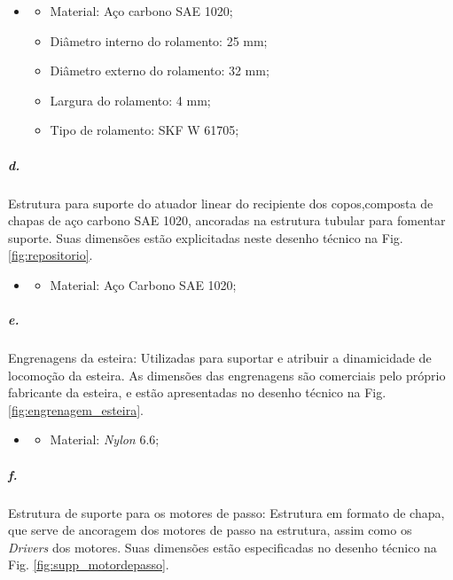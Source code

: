    \begin{itemize}
   \item[]
   \begin{itemize}
       \item  Material: Aço carbono SAE 1020;
       \item  Diâmetro interno do rolamento: 25 mm;
       \item  Diâmetro externo do rolamento: 32 mm;
       \item  Largura do rolamento: 4 mm;
       \item  Tipo de rolamento: SKF W 61705;
   \end{itemize}
   \end{itemize}
     
     
    
   \subparagraph*{d.} \label{retorno_suporte_atuador}  
   Estrutura para suporte do atuador linear do recipiente dos copos,composta de chapas de aço carbono SAE 1020, ancoradas na estrutura tubular para fomentar suporte. 
    Suas dimensões estão explicitadas neste desenho técnico na Fig. \ref{fig:repositorio}.
    
   \begin{itemize}
   \item[]
   \begin{itemize}
       \item Material: Aço Carbono SAE 1020;
   \end{itemize}
   \end{itemize}

    
     
    \subparagraph*{e.} \label{retorno_suporte_esteira}
    Engrenagens da esteira: Utilizadas para suportar e atribuir a dinamicidade de locomoção da esteira.  As dimensões das engrenagens são comerciais pelo próprio fabricante da esteira, e estão apresentadas no desenho técnico na Fig. \ref{fig:engrenagem_esteira}.

    \begin{itemize}
   \item[]
   \begin{itemize}
       \item Material: \textit{Nylon} 6.6;
   \end{itemize}
   \end{itemize}
     
    
    
    \subparagraph*{f.} \label{retorno_suporte_motordepasso}
    Estrutura de suporte para os motores de passo: Estrutura em formato de chapa, que serve de ancoragem dos motores de passo na estrutura, assim como os \textit{Drivers} dos motores. Suas dimensões estão especificadas no desenho técnico na Fig. \ref{fig:supp_motordepasso}.
    

